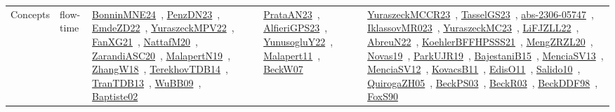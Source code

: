 {\begin{longtable}{lp{3cm}>{\raggedright\arraybackslash}p{6cm}>{\raggedright\arraybackslash}p{6cm}>{\raggedright\arraybackslash}p{8cm}}
\index{flow-time}\index{Concepts!flow-time}Concepts & flow-time & \href{../works/BonninMNE24.pdf}{BonninMNE24}~\cite{BonninMNE24}, \href{../works/PenzDN23.pdf}{PenzDN23}~\cite{PenzDN23}, \href{../works/EmdeZD22.pdf}{EmdeZD22}~\cite{EmdeZD22}, \href{../works/YuraszeckMPV22.pdf}{YuraszeckMPV22}~\cite{YuraszeckMPV22}, \href{../works/FanXG21.pdf}{FanXG21}~\cite{FanXG21}, \href{../works/NattafM20.pdf}{NattafM20}~\cite{NattafM20}, \href{../works/ZarandiASC20.pdf}{ZarandiASC20}~\cite{ZarandiASC20}, \href{../works/MalapertN19.pdf}{MalapertN19}~\cite{MalapertN19}, \href{../works/ZhangW18.pdf}{ZhangW18}~\cite{ZhangW18}, \href{../works/TerekhovTDB14.pdf}{TerekhovTDB14}~\cite{TerekhovTDB14}, \href{../works/TranTDB13.pdf}{TranTDB13}~\cite{TranTDB13}, \href{../works/WuBB09.pdf}{WuBB09}~\cite{WuBB09}, \href{../works/Baptiste02.pdf}{Baptiste02}~\cite{Baptiste02} & \href{../works/PrataAN23.pdf}{PrataAN23}~\cite{PrataAN23}, \href{../works/AlfieriGPS23.pdf}{AlfieriGPS23}~\cite{AlfieriGPS23}, \href{../works/YunusogluY22.pdf}{YunusogluY22}~\cite{YunusogluY22}, \href{../works/Malapert11.pdf}{Malapert11}~\cite{Malapert11}, \href{../works/BeckW07.pdf}{BeckW07}~\cite{BeckW07} & \href{../works/YuraszeckMCCR23.pdf}{YuraszeckMCCR23}~\cite{YuraszeckMCCR23}, \href{../works/TasselGS23.pdf}{TasselGS23}~\cite{TasselGS23}, \href{../works/abs-2306-05747.pdf}{abs-2306-05747}~\cite{abs-2306-05747}, \href{../works/IklassovMR023.pdf}{IklassovMR023}~\cite{IklassovMR023}, \href{../works/YuraszeckMC23.pdf}{YuraszeckMC23}~\cite{YuraszeckMC23}, \href{../works/LiFJZLL22.pdf}{LiFJZLL22}~\cite{LiFJZLL22}, \href{../works/AbreuN22.pdf}{AbreuN22}~\cite{AbreuN22}, \href{../works/KoehlerBFFHPSSS21.pdf}{KoehlerBFFHPSSS21}~\cite{KoehlerBFFHPSSS21}, \href{../works/MengZRZL20.pdf}{MengZRZL20}~\cite{MengZRZL20}, \href{../works/Novas19.pdf}{Novas19}~\cite{Novas19}, \href{../works/ParkUJR19.pdf}{ParkUJR19}~\cite{ParkUJR19}, \href{../works/BajestaniB15.pdf}{BajestaniB15}~\cite{BajestaniB15}, \href{../works/MenciaSV13.pdf}{MenciaSV13}~\cite{MenciaSV13}, \href{../works/MenciaSV12.pdf}{MenciaSV12}~\cite{MenciaSV12}, \href{../works/KovacsB11.pdf}{KovacsB11}~\cite{KovacsB11}, \href{../works/EdisO11.pdf}{EdisO11}~\cite{EdisO11}, \href{../works/Salido10.pdf}{Salido10}~\cite{Salido10}, \href{../works/QuirogaZH05.pdf}{QuirogaZH05}~\cite{QuirogaZH05}, \href{../works/BeckPS03.pdf}{BeckPS03}~\cite{BeckPS03}, \href{../works/BeckR03.pdf}{BeckR03}~\cite{BeckR03}, \href{../works/BeckDDF98.pdf}{BeckDDF98}~\cite{BeckDDF98}, \href{../works/FoxS90.pdf}{FoxS90}~\cite{FoxS90}\\

\end{longtable}}
